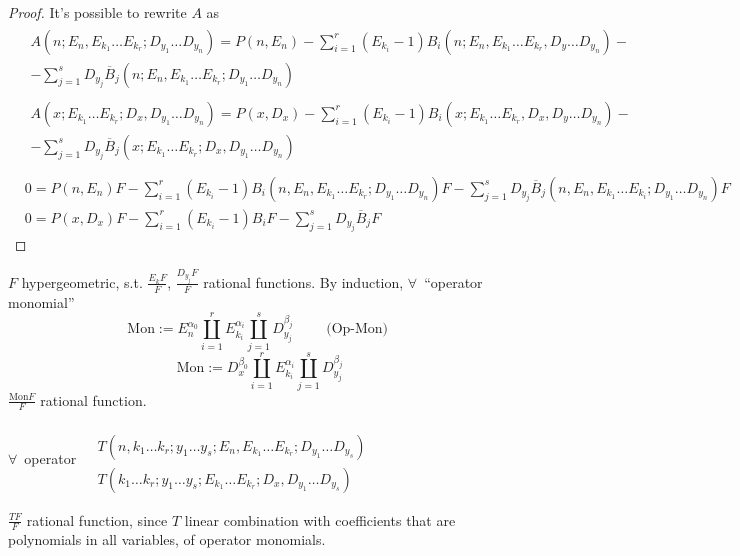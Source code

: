 \documentclass[10pt]{amsart}
\begin{document}
\begin{multicols*}{2}
\begin{proof}
It's possible to rewrite $A$ as 
\[
\begin{aligned}
& \begin{gathered}
  A(n;E_n,E_{k_1} \dots E_{k_r} ; D_{y_1} \dots D_{y_n} ) = P(n,E_n) - \sum_{i=1}^r (E_{k_i}-1)B_i(n;E_n,E_{k_1} \dots E_{k_r}, D_y \dots D_{y_n}) - \\
  - \sum_{j=1}^s D_{y_j} \overline{B}_j(n;E_n,E_{k_1} \dots E_{k_r}; D_{y_1} \dots D_{y_n}) 
\end{gathered} \\ 
  & \begin{gathered}  
      A(x;E_{k_1} \dots E_{k_r} ; D_x, D_{y_1} \dots D_{y_n} ) = P(x,D_x) - \sum_{i=1}^r (E_{k_i}-1)B_i(x;E_{k_1} \dots E_{k_r}, D_x,D_y \dots D_{y_n}) - \\
      - \sum_{j=1}^s D_{y_j} \overline{B}_j(x;E_{k_1} \dots E_{k_r}; D_x,D_{y_1} \dots D_{y_n}) \\ 
\end{gathered}
\end{aligned}
\]
\[
\begin{aligned}
  & 0 = P(n,E_n)F - \sum_{i=1}^r (E_{k_i}-1)B_i(n,E_n,E_{k_1}\dots E_{k_r};D_{y_1} \dots D_{y_n})F - \sum_{j=1}^s D_{y_j}\overline{B}_j(n,E_n,E_{k_1} \dots E_{k_i}; D_{y_1} \dots D_{y_n})F \\
  & 0 = P(x,D_x)F - \sum_{i=1}^r (E_{k_i}-1)B_iF - \sum_{j=1}^sD_{y_j}\overline{B}_jF
\end{aligned}
\]
\end{proof}
$F$ hypergeometric, s.t. $\frac{E_kF}{F}$, $\frac{D_{y_j}F}{F}$ rational functions.  By induction, $\forall \, $ ``operator monomial''
\[
\text{Mon}:= E_n^{\alpha_0} \coprod_{i=1}^r E_{k_i}^{\alpha_i} \coprod_{j=1}^s D_{y_j}^{\beta_j} \qquad \text{ (Op-Mon) }
\]
\[
\text{Mon} := D_x^{\beta_0} \coprod_{i=1}^r E_{k_i}^{\alpha_i} \coprod_{j=1}^s D_{y_j}^{\beta_j}
\]
$\frac{\text{Mon}F}{F}$ rational function. 

$\forall \, $ operator $\begin{aligned} & \quad \\
  & T(n,k_1 \dots k_r; y_1 \dots y_s; E_n, E_{k_1} \dots E_{k_r}; D_{y_1} \dots D_{y_s} ) \\ 
  & T(k_1 \dots k_r; y_1 \dots y_s; E_{k_1} \dots E_{k_r}; D_x, D_{y_1} \dots D_{y_s} ) \end{aligned}$

$\frac{TF}{F}$ rational function, since $T$ linear combination with coefficients that are polynomials in all variables, of operator monomials.  


\end{multicols*}
\end{document}
